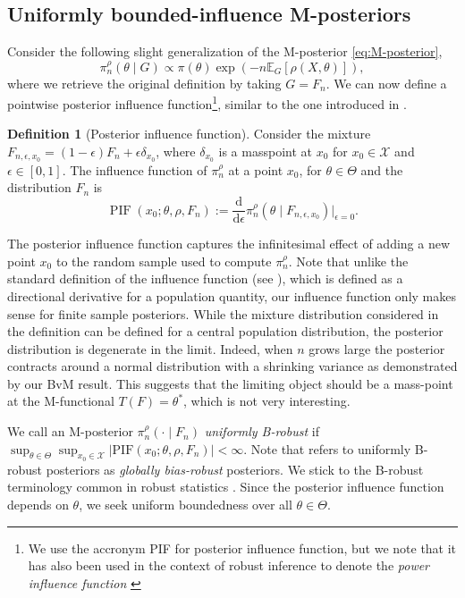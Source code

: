 \documentclass[11pt, oneside]{amsart}
\theoremstyle{definition}   %
\newtheorem{definition}{Definition}
\newcommand{\E}{\mathbb{E}}
\newcommand{\PIF}{\operatorname{PIF}}
\newcommand{\loss}{\rho}
\newcommand{\mposterior}{\pi_n^{\loss}}
\begin{document}
\subsection{Uniformly bounded-influence M-posteriors}
%
%
Consider the following slight generalization of the M-posterior \eqref{eq:M-posterior},
%
\[
\pi_n^\rho(\theta \mid G) \propto \pi(\theta)\exp\left(-n \E_{G} \left[\rho\left(X, \theta\right)\right]\right),
\]
where we retrieve the original definition by taking \( G = F_n\). We can now define a pointwise posterior influence function\footnote{We use the accronym PIF for posterior influence function, but we note that it has also been used in the context of robust inference to denote the \emph{power influence function} \cite{hampeletal1986,heritier:ronchetti1994}}, similar to the one introduced in \cite{ghosh:basu2016}.
%

\begin{definition}[Posterior influence function]
Consider the mixture \( F_{n,\epsilon,x_0} = (1 - \epsilon) F_n + \epsilon \delta_{x_0} \), where $\delta_{x_0}$ is a masspoint at $x_0$ for  \( x_0 \in \mathcal{X}\) and \( \epsilon \in [0, 1]\). The influence function of $\mposterior$ at a point $x_0$, for $\theta\in\Theta$ and the distribution $F_n$ is 
%
\begin{equation*}
    \PIF(x_0; \theta, \loss, F_n) 
    := \frac{\mathrm{d}}{\mathrm{d} \epsilon} \mposterior (\theta \mid F_{n,\epsilon,x_0}) \Big |_{\epsilon=0}.
\end{equation*}
%
\end{definition}
%
The posterior influence function captures the infinitesimal effect of adding a new point $x_0$ to the random sample used to compute $\mposterior$. Note that unlike the standard definition of the influence function (see \cite{hampeletal1986,huber:ronchetti2009}), which is defined as a directional derivative for a population quantity, our influence function only makes sense for finite sample posteriors. While the mixture distribution considered in the definition can be defined for a central population distribution, the posterior distribution is degenerate in the limit. Indeed, when $n$ grows large the posterior contracts around a normal distribution with a shrinking variance as demonstrated by our BvM result. This suggests that the limiting object should be a mass-point at the M-functional $T(F)=\theta^*$, which is not very interesting.

%
We call an M-posterior \( \mposterior (\cdot \mid F_n) \) \emph{uniformly B-robust} if \( \sup_{\theta \in \Theta} \sup_{x_0 \in \mathcal{X}} |\textrm{PIF}(x_0;\theta,\loss, F_n)| < \infty \). Note that \cite{matsubara:knoblauch:briol:oates2022} refers to uniformly B-robust posteriors as \emph{globally bias-robust} posteriors. We stick to the  B-robust terminology common in robust statistics \citep{hampeletal1986}. Since the posterior influence function depends on $\theta$, we seek uniform boundedness over all $\theta\in \Theta$.
\end{document}
